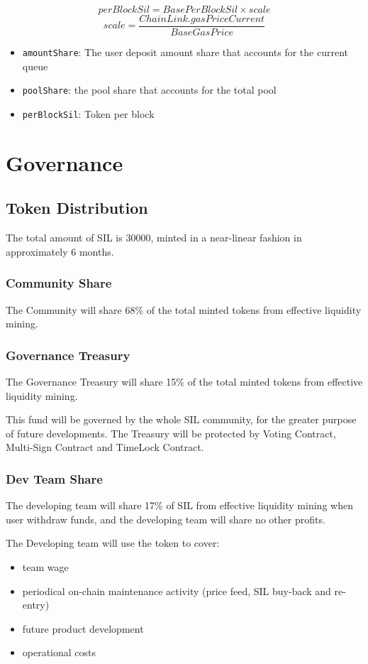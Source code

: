 \documentclass[11pt,letterpaper]{article}
\begin{document}
\begin{multicols}{2}
\[ perBlockSil =  BasePerBlockSil \times scale \]
\[ scale = \frac{ChainLink.gasPriceCurrent}{BaseGasPrice} \]
\begin{itemize}
    \item \texttt{amountShare}: The user deposit amount share that accounts for the current queue
    \item \texttt{poolShare}: the pool share that accounts for the total pool
    \item \texttt{perBlockSil}: Token per block
\end{itemize}

\section{Governance}
\subsection{Token Distribution}
The total amount of SIL is 30000, minted in a near-linear fashion in approximately 6 months.

\subsubsection{Community Share}
The Community will share 68\% of the total minted tokens from effective liquidity mining.

\subsubsection{Governance Treasury}
The Governance Treasury will share 15\% of the total minted tokens from effective liquidity mining.

This fund will be governed by the whole SIL community, for the greater purpose of future developments. The Treasury will be protected by Voting Contract, Multi-Sign Contract and TimeLock Contract.

\subsubsection{Dev Team Share}
The developing team will share 17\% of SIL from effective liquidity mining when user withdraw funds, and the developing team will share no other profits.

The Developing team will use the token to cover:
\begin{itemize}
    \item team wage
    \item periodical on-chain maintenance activity (price feed, SIL buy-back and re-entry)
    \item future product development
    \item operational costs
\end{itemize}


\end{multicols}
\end{document}

